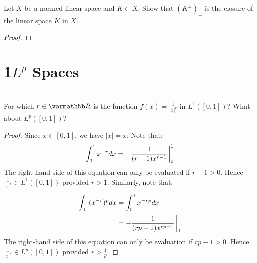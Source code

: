 \begin{exercise}
    Let $X$ be a normed linear space and $K \subset X$. Show that $(K^\perp)_{\perp}$ is the closure of the linear space $K$ in $X$.
\end{exercise}
    {\color{red} \begin{proof}
        
    \end{proof}}

\section{\h1$L^p$ Spaces}

\section*{}

\begin{exercise}
For which $r \in \bfR$ is the function $f(x) = \frac{1}{|x|^r}$ in $L^1([0,1])$? What about $L^p([0,1])$?
\end{exercise}
    \begin{proof}
        Since $x \in [0,1]$, we have $|x| = x$.
        Note that:
            \begin{equation*}
            \begin{split}
                \int_0^1 x^{-r}dx = -\frac{1}{(r-1)x^{r-1}}\h1\bigg\rvert_{0}^1
            \end{split}
            \end{equation*}
        The right-hand side of this equation can only be evaluated if $r-1 > 0$. Hence $\frac{1}{|x|^r} \in L^1([0,1])$ provided $r>1$. Similarly, note that:
            \begin{equation*}
            \begin{split}
                \int_0^1 (x^{-r})^p dx
                & = \int_0^1 x^{-rp}dx \\
                & = -\frac{1}{(rp-1)x^{rp-1}}\h1\bigg\rvert_{0}^1 \\
            \end{split}
            \end{equation*}
        The right-hand side of this equation can only be evaluation if $rp-1 > 0$. Hence $\frac{1}{|x|^r} \in L^p([0,1])$ provided $r>\frac{1}{p}$.
    \end{proof}